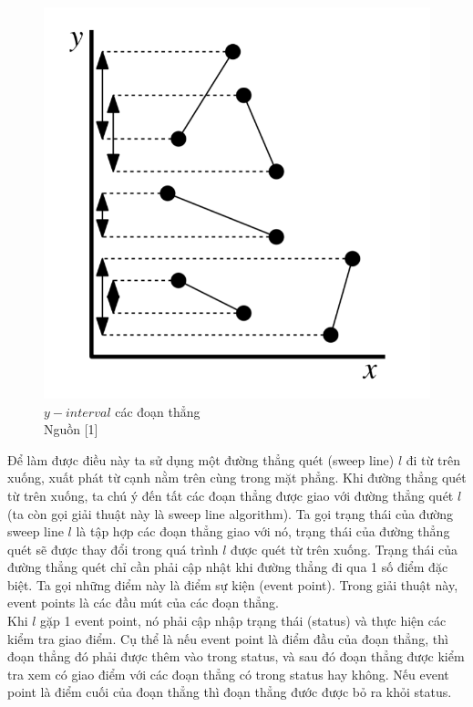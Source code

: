 \documentclass[15pt]{article}
\begin{document}
{\begin{figure}[h!]
\centering
\includegraphics[scale=0.36]{./y_interval.png}
\caption{$y-interval$ các đoạn thẳng \\ Nguồn [1]}
\label{fig: y interval}
\end{figure}
Để làm được điều này ta sử dụng một đường thẳng quét (sweep line) $l$ đi từ trên xuống, xuất phát từ cạnh nằm trên cùng trong mặt phẳng. Khi đường thẳng quét từ trên xuống, ta chú ý đến tất các đoạn thẳng được giao với đường thẳng quét $l$ (ta còn gọi giải thuật này là sweep line algorithm). Ta gọi trạng thái của đường sweep line $l$ là tập hợp các đoạn thẳng giao với nó, trạng thái của đường thẳng quét sẽ được thay đổi trong quá trình $l$ được quét từ trên xuống. Trạng thái của đường thẳng quét chỉ cần phải cập nhật khi đường thẳng đi qua 1 số điểm đặc biệt. Ta gọi những điểm này là điểm sự kiện (event point). Trong giải thuật này, event points là các đầu mút của các đoạn thẳng. \\

Khi $l$ gặp 1 event point, nó phải cập nhập trạng thái (status) và thực hiện các kiểm tra giao điểm. Cụ thể là nếu event point là điểm đầu của đoạn thẳng, thì đoạn thẳng đó phải được thêm vào trong status, và sau đó đoạn thẳng được kiểm tra xem có giao điểm với các đoạn thẳng có trong status hay không. Nếu event point là điểm cuối của đoạn thẳng thì đoạn thẳng đước được bỏ ra khỏi status.\\

}
\end{document}
